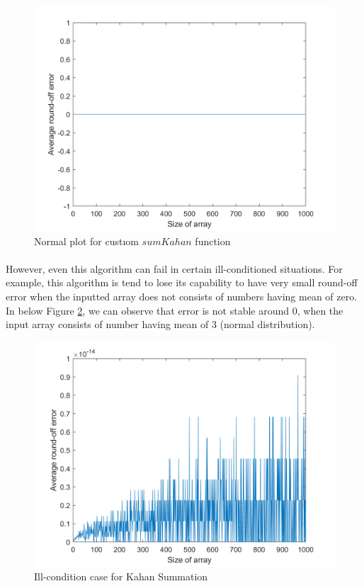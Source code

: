 \documentclass[letterpaper,12pt]{article}
\begin{document}
\begin{figure}[H] 
   \centering \includegraphics[width=0.5\columnwidth]{figures/sumKahan.png}           
                \caption{Normal plot for custıom $sumKahan$ function}                
                   \label{fig:normalsumKahan}
   \end{figure}

   \paragraph{} However, even this algorithm can fail in certain ill-conditioned situations. For example, this algorithm is tend to lose its capability to have very small round-off error when the inputted array does not consists of numbers having mean of zero. In below Figure \ref{fig:kahanill}, we can observe that error is not stable around $0$, when the input array consists of number having mean of $3$ (normal distribution).
\begin{figure}[H] 
   \centering \includegraphics[width=0.7\columnwidth]{figures/kahanill.png}           
                \caption{Ill-condition case for Kahan Summation}                
                   \label{fig:kahanill}
   \end{figure}
\end{document}
